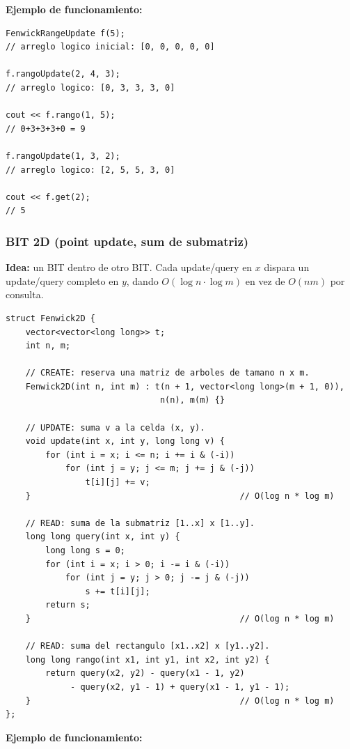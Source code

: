 \documentclass[10pt,a4paper,twocolumn]{article}
\begin{document}
\textbf{Ejemplo de funcionamiento:}

\begin{lstlisting}[style=cpp]
FenwickRangeUpdate f(5);
// arreglo logico inicial: [0, 0, 0, 0, 0]

f.rangoUpdate(2, 4, 3);
// arreglo logico: [0, 3, 3, 3, 0]

cout << f.rango(1, 5);
// 0+3+3+3+0 = 9

f.rangoUpdate(1, 3, 2);
// arreglo logico: [2, 5, 5, 3, 0]

cout << f.get(2);
// 5
\end{lstlisting}

\subsubsection{BIT 2D (point update, sum de submatriz)}

\textbf{Idea:} un BIT dentro de otro BIT. Cada update/query en $x$
dispara un update/query completo en $y$, dando $O(\log n \cdot
\log m)$ en vez de $O(nm)$ por consulta.

\begin{lstlisting}[style=cpp]
struct Fenwick2D {
    vector<vector<long long>> t;
    int n, m;

    // CREATE: reserva una matriz de arboles de tamano n x m.
    Fenwick2D(int n, int m) : t(n + 1, vector<long long>(m + 1, 0)),
                               n(n), m(m) {}

    // UPDATE: suma v a la celda (x, y).
    void update(int x, int y, long long v) {
        for (int i = x; i <= n; i += i & (-i))
            for (int j = y; j <= m; j += j & (-j))
                t[i][j] += v;
    }                                          // O(log n * log m)

    // READ: suma de la submatriz [1..x] x [1..y].
    long long query(int x, int y) {
        long long s = 0;
        for (int i = x; i > 0; i -= i & (-i))
            for (int j = y; j > 0; j -= j & (-j))
                s += t[i][j];
        return s;
    }                                          // O(log n * log m)

    // READ: suma del rectangulo [x1..x2] x [y1..y2].
    long long rango(int x1, int y1, int x2, int y2) {
        return query(x2, y2) - query(x1 - 1, y2)
             - query(x2, y1 - 1) + query(x1 - 1, y1 - 1);
    }                                          // O(log n * log m)
};
\end{lstlisting}

\textbf{Ejemplo de funcionamiento:}
\end{document}
